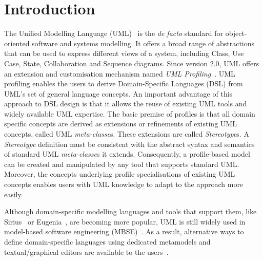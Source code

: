\section{Introduction}
\label{sec:introduction}

The Unified Modelling Language (UML)~\cite{UML2015OMG} is the \emph{de facto} standard for object-oriented software and systems modelling. 
It offers a broad range of abstractions that can be used to express different views of a system, including Class, Use Case, State, Collaboration and Sequence diagrams. 
Since version 2.0, UML offers an extension and customisation mechanism named \emph{UML Profiling}~\cite{FuentesFernandez2004:UMLME}.
UML profiling enables the users to derive Domain-Specific Languages (DSL) from UML's set of general language concepts.
An important advantage of this approach to DSL design is that it allows the reuse of existing UML tools and widely available UML expertise.
The basic premise of profiles is that all domain specific concepts are derived as extensions or refinements of existing UML concepts, called UML \textit{meta-classe}s. 
These extensions are called \textit{Stereotype}s. 
A \textit{Stereotype} definition must be consistent with the abstract syntax and semantics of standard UML \textit{meta-classe}s it extends. 
Consequently, a profile-based model can be created and manipulated by any tool that supports standard UML. 
Moreover, the concepts underlying profile specialisations of existing UML concepts enables users with UML knowledge to adapt to the approach more easily.


Although domain-specific modelling languages and tools that support them, like Sirius~\cite{viyovic2014sirius} or Eugenia~\cite{kolovos2015eugenia}, are becoming more popular, UML is still widely used in model-based software engineering (MBSE)~\cite{erickson2007theoretical}. 
As a result, alternative ways to define domain-specific languages using dedicated metamodels and textual/graphical editors are available to the users~\cite{Bergmayr2014:MODELS,Pardillo2010:MODELS}. 

